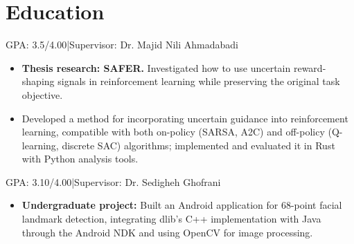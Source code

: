 \section{Education}
GPA: 3.5/4.00\enspace|\enspace Supervisor: Dr. Majid Nili Ahmadabadi
\begin{itemize}
  \item \textbf{Thesis research: SAFER.} Investigated how to use uncertain reward-shaping signals in reinforcement learning while preserving the original task objective.
  \item Developed a method for incorporating uncertain guidance into reinforcement learning, compatible with both on-policy (SARSA, A2C) and off-policy (Q-learning, discrete SAC) algorithms; implemented and evaluated it in Rust with Python analysis tools.
\end{itemize}
GPA: 3.10/4.00\enspace|\enspace Supervisor: Dr. Sedigheh Ghofrani
\begin{itemize}
  \item \textbf{Undergraduate project:} Built an Android application for 68-point facial landmark detection, integrating dlib's C++ implementation with Java through the Android NDK and using OpenCV for image processing.
\end{itemize}
